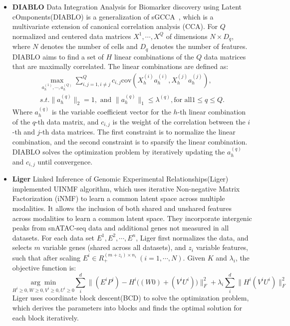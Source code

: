\begin{itemize}
    \item \textbf{DIABLO}
    Data Integration Analysis for Biomarker discovery using Latent cOmponents(DIABLO) is a generalization of sGCCA~\citep{tenenhaus2014variable}, which is a multivariate extension of canonical correlation analysis (CCA). For $Q$ normalized and centered data matrices $X^1, \cdots, X^Q$ of dimensions $N\times D_q$, where $N$ denotes the number of cells and $D_q$ denotes the number of features. DIABLO aims to find a set of $H$ linear combinations of the $Q$ data matrices that are maximally correlated. The linear combinations are defined as:
    \begin{equation}
    \begin{aligned}
    	\underset{a_h^{(1)},\cdots,a_h^{(Q)}}{\max} \sum_{i,j=1, i\neq j}^Q c_{i,j} \text{cov}(X_h^{(i)} a_h^{(i)}, X_h^{(j)} a_h^{(j)}),\\
    	s.t. \|a_h^{(q)}\|_2 = 1, \text{ and } \|a_h^{(q)}\|_1 \leq \lambda^{(q)}, \text{for all} 1\leq q \leq Q.
    \end{aligned}
    \end{equation}
    Where $a_h^{(q)}$ is the variable coefficient vector for the $h$-th linear combination of the $q$-th data matrix, and $c_{i,j}$ is the weight of the correlation between the $i$-th and $j$-th data matrices. The first constraint is to normalize the linear combination, and the second constraint is to sparsify the linear combination. DIABLO solves the optimization problem by iteratively updating the $a_h^{(q)}$ and $c_{i,j}$ until convergence. 

    \item \textbf{Liger}
    Linked Inference of Genomic Experimental Relationships(Liger)\citep{kriebel2022uinmf} implemented UINMF algorithm, which uses iterative Non-negative Matrix Factorization (iNMF) to learn a common latent space across multiple modalities. It allows the inclusion of both shared and unshared features across modalities to learn a common latent space. They incorporate intergenic peaks from snATAC-seq data and additional genes not measured in all datasets. For each data set $E^1, E^2, \cdots, E^n$, Liger first normalizes the data, and selects $m$ variable genes (shared across all datasets), and $z_i$ variable features, such that after scaling $E^i \in R_{+}^{(m+z_i)\times n_i}\ (i=1,\cdots,N)$. Given $K$ and $\lambda_i$, the objective function is:
    \begin{equation}
	   \underset{H^i\geq 0,W\geq 0, V^i\geq 0, U^i \geq 0}{\arg\min} \sum_i^{d}\Big\| (E^i P^i) - H^i \big((W 0) + (V^i U^i)\big)\Big\|_{F}^2 + \lambda_i\sum_i^d\Big\|H^i(V^i U^i)\Big\|_{F}^2
    \end{equation}
    Liger uses coordinate block descent(BCD) to solve the optimization problem, which derives the parameters into blocks and finds the optimal solution for each block iteratively.
    

\end{itemize}
